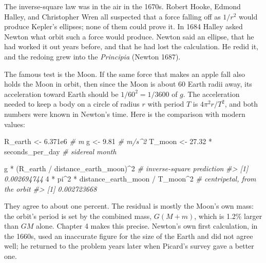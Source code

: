 \documentclass[
  10.5pt,
  letterpaper,
]{scrbook}
\newenvironment{Shaded}{\begin{snugshade}}{\end{snugshade}}
\newcommand{\CommentTok}[1]{\textcolor[rgb]{0.00,0.00,0.00}{\textit{#1}}}
\newcommand{\DecValTok}[1]{\textcolor[rgb]{0.00,0.00,0.00}{#1}}
\newcommand{\FloatTok}[1]{\textcolor[rgb]{0.00,0.00,0.00}{#1}}
\newcommand{\NormalTok}[1]{\textcolor[rgb]{0.00,0.00,0.00}{#1}}
\newcommand{\OtherTok}[1]{\textcolor[rgb]{0.00,0.00,0.00}{#1}}
\newcommand{\SpecialCharTok}[1]{\textcolor[rgb]{0.00,0.00,0.00}{#1}}
\newcounter{none} %
\theoremstyle{definition}
\theoremstyle{plain}
\theoremstyle{remark}
\begin{document}
\begin{tcolorbox}[enhanced jigsaw, arc=.35mm, bottomrule=.15mm, bottomtitle=1mm, breakable, colback=white, colbacktitle=quarto-callout-note-color!10!white, colframe=quarto-callout-note-color-frame, coltitle=black, left=2mm, leftrule=.75mm, opacityback=0, opacitybacktitle=0.6, rightrule=.15mm, title={Where it comes from}, titlerule=0mm, toprule=.15mm, toptitle=1mm]

The inverse-square law was in the air in the 1670s. Robert Hooke, Edmond
Halley, and Christopher Wren all suspected that a force falling off as
\(1/r^2\) would produce Kepler's ellipses; none of them could prove it.
In 1684 Halley asked Newton what orbit such a force would produce.
Newton said an ellipse, that he had worked it out years before, and that
he had lost the calculation. He redid it, and the redoing grew into the
\emph{Principia} (Newton 1687).

The famous test is the Moon. If the same force that makes an apple fall
also holds the Moon in orbit, then since the Moon is about 60 Earth
radii away, its acceleration toward Earth should be \(1/60^2 = 1/3600\)
of \(g\). The acceleration needed to keep a body on a circle of radius
\(r\) with period \(T\) is \(4\pi^2 r/T^2\), and both numbers were known
in Newton's time. Here is the comparison with modern values:

\begin{Shaded}
\begin{Highlighting}[]
\NormalTok{R\_earth }\OtherTok{\textless{}{-}} \FloatTok{6.371e6}                           \CommentTok{\# m}
\NormalTok{g       }\OtherTok{\textless{}{-}} \FloatTok{9.81}                              \CommentTok{\# m/s\^{}2}
\NormalTok{T\_moon  }\OtherTok{\textless{}{-}} \FloatTok{27.32} \SpecialCharTok{*}\NormalTok{ seconds\_per\_day           }\CommentTok{\# sidereal month}

\NormalTok{g }\SpecialCharTok{*}\NormalTok{ (R\_earth }\SpecialCharTok{/}\NormalTok{ distance\_earth\_moon)}\SpecialCharTok{\^{}}\DecValTok{2}        \CommentTok{\# inverse{-}square prediction}
\CommentTok{\#\textgreater{} [1] 0.002694744}
\DecValTok{4} \SpecialCharTok{*}\NormalTok{ pi}\SpecialCharTok{\^{}}\DecValTok{2} \SpecialCharTok{*}\NormalTok{ distance\_earth\_moon }\SpecialCharTok{/}\NormalTok{ T\_moon}\SpecialCharTok{\^{}}\DecValTok{2}    \CommentTok{\# centripetal, from the orbit}
\CommentTok{\#\textgreater{} [1] 0.002723668}
\end{Highlighting}
\end{Shaded}

They agree to about one percent. The residual is mostly the Moon's own
mass: the orbit's period is set by the combined mass, \(G(M+m)\), which
is 1.2\% larger than \(GM\) alone. Chapter 4 makes this precise.
Newton's own first calculation, in the 1660s, used an inaccurate figure
for the size of the Earth and did not agree well; he returned to the
problem years later when Picard's survey gave a better one.

\end{tcolorbox}
\end{document}
